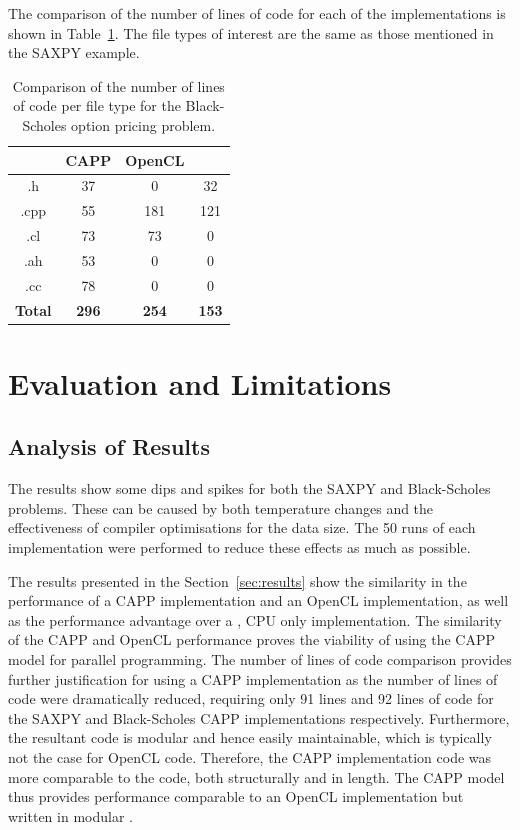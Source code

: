 \documentclass{sig-alternate-05-2015}
\begin{document}
The comparison of the number of lines of code for each of the implementations is
shown in Table~\ref{tab:blackscholes}. The file types of interest are the same as 
those mentioned in the SAXPY example. 

\begin{table}[!b]
\centering
\caption{Comparison of the number of lines of code per file type for the
Black-Scholes option pricing problem.}
\label{tab:blackscholes}
\begin{tabular}{|c|c|c|c|} 
	\hline
				& CAPP			& OpenCL		& \CPP		\\ \hline
.h				& 37			& 0				& 32		\\ \hline
.cpp			& 55			& 181			& 121		\\ \hline
.cl				& 73			& 73			& 0			\\ \hline
.ah				& 53			& 0				& 0			\\ \hline
.cc				& 78			& 0				& 0			\\ \hline
\textbf{Total}	& \textbf{296}	& \textbf{254}	& \textbf{153}		\\ \hline		
\hline
\end{tabular}
\end{table}


\section{Evaluation and Limitations}\label{sec:evaluation}

\subsection{Analysis of Results}

The results show some dips and spikes for both the SAXPY and Black-Scholes
problems. These can be caused by both temperature changes and the effectiveness
of compiler optimisations for the data size. The 50 runs of each implementation
were performed to reduce these effects as much as possible.

The results presented in the Section~\ref{sec:results} show the similarity in
the performance of a CAPP implementation and an OpenCL implementation, as
well as the performance advantage over a \CPP, CPU only implementation. The
similarity of the CAPP and OpenCL performance proves the viability of
using the CAPP model for parallel programming. The number of lines of 
code comparison provides further justification for using a CAPP
implementation as the number of lines of \CPP code were dramatically
reduced, requiring only 91 lines and 92 lines of \CPP code for the SAXPY and
Black-Scholes CAPP implementations respectively.
Furthermore, the resultant \CPP code is modular and hence easily maintainable, 
which is typically not the case for OpenCL code. Therefore,
the CAPP implementation code was more comparable to the \CPP code,
both structurally and in length. The CAPP model thus provides
performance comparable to an OpenCL implementation but written in modular \CPP.
\end{document}
